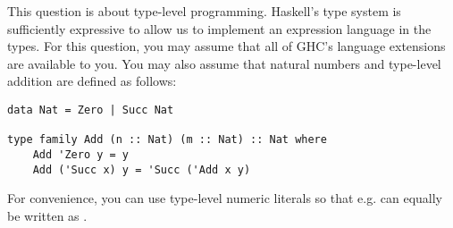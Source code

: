 \question This question is about type-level programming. Haskell's type system is sufficiently expressive to allow us to implement an expression language in the types. For this question, you may assume that all of GHC's language extensions are available to you. You may also assume that natural numbers and type-level addition are defined as follows:
\begin{verbatim}
data Nat = Zero | Succ Nat

type family Add (n :: Nat) (m :: Nat) :: Nat where
    Add 'Zero y = y
    Add ('Succ x) y = 'Succ ('Add x y)
\end{verbatim}
For convenience, you can use type-level numeric literals so that e.g.  can equally be written as .

